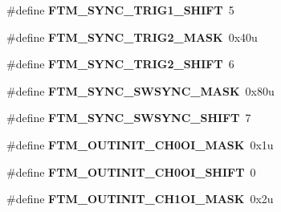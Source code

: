 \begin{DoxyCompactItemize}
\item 
\#define {\bfseries F\+T\+M\+\_\+\+S\+Y\+N\+C\+\_\+\+T\+R\+I\+G1\+\_\+\+S\+H\+I\+FT}~5\hypertarget{group__FTM__Register__Masks_ga44401f020ce66143ee97582e21332fe9}{}\label{group__FTM__Register__Masks_ga44401f020ce66143ee97582e21332fe9}

\item 
\#define {\bfseries F\+T\+M\+\_\+\+S\+Y\+N\+C\+\_\+\+T\+R\+I\+G2\+\_\+\+M\+A\+SK}~0x40u\hypertarget{group__FTM__Register__Masks_gaf1b0377ca3de3fac73b014406084a05b}{}\label{group__FTM__Register__Masks_gaf1b0377ca3de3fac73b014406084a05b}

\item 
\#define {\bfseries F\+T\+M\+\_\+\+S\+Y\+N\+C\+\_\+\+T\+R\+I\+G2\+\_\+\+S\+H\+I\+FT}~6\hypertarget{group__FTM__Register__Masks_gafd88ca49160a6fb4bb24f6ed57180b87}{}\label{group__FTM__Register__Masks_gafd88ca49160a6fb4bb24f6ed57180b87}

\item 
\#define {\bfseries F\+T\+M\+\_\+\+S\+Y\+N\+C\+\_\+\+S\+W\+S\+Y\+N\+C\+\_\+\+M\+A\+SK}~0x80u\hypertarget{group__FTM__Register__Masks_gaa3cb833bf90ebaf61a187b421a956a30}{}\label{group__FTM__Register__Masks_gaa3cb833bf90ebaf61a187b421a956a30}

\item 
\#define {\bfseries F\+T\+M\+\_\+\+S\+Y\+N\+C\+\_\+\+S\+W\+S\+Y\+N\+C\+\_\+\+S\+H\+I\+FT}~7\hypertarget{group__FTM__Register__Masks_ga0ff121b844150b34a80e0d43d851c7a1}{}\label{group__FTM__Register__Masks_ga0ff121b844150b34a80e0d43d851c7a1}

\item 
\#define {\bfseries F\+T\+M\+\_\+\+O\+U\+T\+I\+N\+I\+T\+\_\+\+C\+H0\+O\+I\+\_\+\+M\+A\+SK}~0x1u\hypertarget{group__FTM__Register__Masks_ga25049f81cfbb792f293e74d623d1a945}{}\label{group__FTM__Register__Masks_ga25049f81cfbb792f293e74d623d1a945}

\item 
\#define {\bfseries F\+T\+M\+\_\+\+O\+U\+T\+I\+N\+I\+T\+\_\+\+C\+H0\+O\+I\+\_\+\+S\+H\+I\+FT}~0\hypertarget{group__FTM__Register__Masks_ga3fdff5ede58f533fe4ecc296db939b4b}{}\label{group__FTM__Register__Masks_ga3fdff5ede58f533fe4ecc296db939b4b}

\item 
\#define {\bfseries F\+T\+M\+\_\+\+O\+U\+T\+I\+N\+I\+T\+\_\+\+C\+H1\+O\+I\+\_\+\+M\+A\+SK}~0x2u\hypertarget{group__FTM__Register__Masks_ga36d7ebc12c5244ef6852a0327113420e}{}\label{group__FTM__Register__Masks_ga36d7ebc12c5244ef6852a0327113420e}


\end{DoxyCompactItemize}
